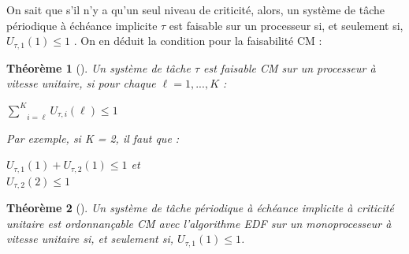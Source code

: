 \documentclass[11pt,a4paper,oneside]{book}
\theoremstyle{break}
\theoremstyle{breakplain}
\newtheorem{theo}{Théorème}
\begin{document}
On sait que s'il n'y a qu'un seul niveau de criticité, alors, un système de tâche périodique à échéance implicite $\tau$ est faisable sur un processeur si, et seulement si, $U_{\tau, 1}(1) \leq 1$ \cite{liu1973scheduling}. On en déduit la condition pour la faisabilité CM :
\begin{theo}[\cite{BaruahBDMSS11}]
Un système de tâche $\tau$ est faisable CM sur un processeur à vitesse unitaire, si pour chaque $\ell = 1, ..., K$ :
\begin{center}
$\underset{i = \ell}{\overset{K}{\sum}} U_{\tau,i}(\ell) \leq 1$
\end{center}
 
 Par exemple, si K = 2, il faut que :
 
\begin{center}
$U_{\tau, 1}(1) + U_{\tau, 2}(1) \leq 1$ et\\
$U_{\tau, 2}(2) \leq 1$
\end{center}
\end{theo}

\begin{theo}[\cite{BaruahBDMSS11}]
Un système de tâche périodique à échéance implicite à criticité unitaire est ordonnançable CM avec l'algorithme EDF sur un monoprocesseur à vitesse unitaire si, et seulement si, $U_{\tau, 1}(1) \leq 1$.
\end{theo}
\end{document}
